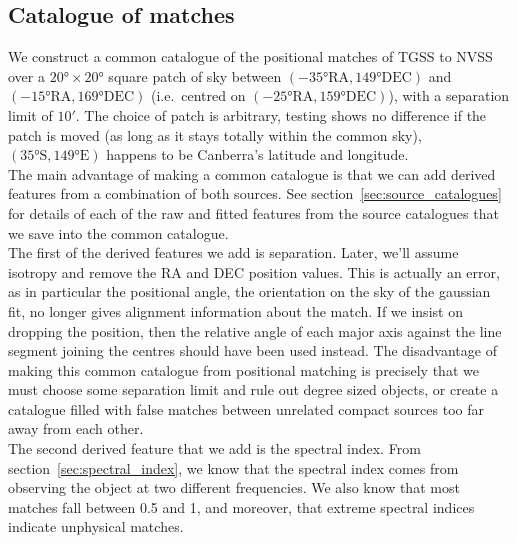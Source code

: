 \documentclass[12pt,a4paper]{article}
\begin{document}
\newpage
\subsection{Catalogue of matches}
\label{sec:catalogue_of_matches}
We construct a common catalogue of the positional matches of TGSS to NVSS over a $\ang{20}\times\ang{20}$ square patch of sky between $(-\ang{35}\mathrm{RA}, \ang{149}\mathrm{DEC})$ and $(-\ang{15}\mathrm{RA}, \ang{169}\mathrm{DEC})$ (i.e.\ centred on $(-\ang{25}\mathrm{RA}, \ang{159}\mathrm{DEC})$), with a separation limit of $\ang{;10;}$. The choice of patch is arbitrary, testing shows no difference if the patch is moved (as long as it stays totally within the common sky), $(\ang{35}\mathrm{S}, \ang{149}\mathrm{E})$ happens to be Canberra's latitude and longitude.\\

The main advantage of making a common catalogue is that we can add derived features from a combination of both sources. See section~\ref{sec:source_catalogues} for details of each of the raw and fitted features from the source catalogues that we save into the common catalogue.\\

The first of the derived features we add is separation. Later, we'll assume isotropy and remove the RA and DEC position values. This is actually an error, as in particular the positional angle, the orientation on the sky of the gaussian fit, no longer gives alignment information about the match. If we insist on dropping the position, then the relative angle of each major axis against the line segment joining the centres should have been used instead.
The disadvantage of making this common catalogue from positional matching is precisely that we must choose some separation limit and rule out degree sized objects, or create a catalogue filled with false matches between unrelated compact sources too far away from each other.\\

The second derived feature that we add is the spectral index. From section~\ref{sec:spectral_index}, we know that the spectral index comes from observing the object at two different frequencies. We also know that most matches fall between 0.5 and 1, and moreover, that extreme spectral indices indicate unphysical matches.\\
\end{document}
